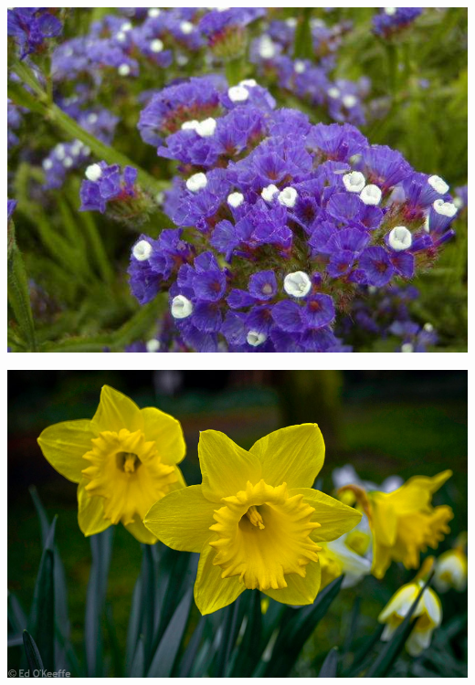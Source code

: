 \documentclass{article}
\begin{document}
\begin{center}
\includegraphics[height=0.925\paperheight]{../Limonium_sinuatum.jpg}
\end{center}
\newpage

\begin{center}
\includegraphics[height=0.925\paperheight]{../Narcissus_(Daffodil).jpg}
\end{center}
\newpage
\end{document}
